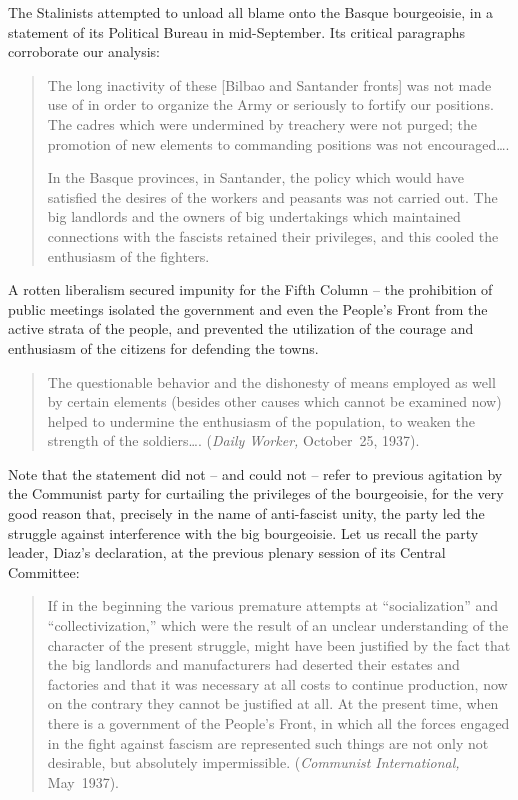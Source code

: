 The Stalinists attempted to unload all blame onto the Basque bourgeoisie, in a statement of its Political Bureau in mid-September. Its critical paragraphs corroborate our analysis:

\begin{quotation}
  The long inactivity of these [Bilbao and Santander fronts] was not made use of in order to organize the Army or seriously to fortify our positions. The cadres which were undermined by treachery were not purged; the promotion of new elements to commanding positions was not encouraged\dots.
  
  In the Basque provinces, in Santander, the policy which would have satisfied the desires of the workers and peasants was not carried out. The big landlords and the owners of big undertakings which maintained connections with the fascists retained their privileges, and this cooled the enthusiasm of the fighters.
\end{quotation}

A rotten liberalism secured impunity for the Fifth Column -- the prohibition of public meetings isolated the government and even the People’s Front from the active strata of the people, and prevented the utilization of the courage and enthusiasm of the citizens for defending the towns.

\begin{quotation}
  The questionable behavior and the dishonesty of means employed as well by certain elements (besides other causes which cannot be examined now) helped to undermine the enthusiasm of the population, to weaken the strength of the soldiers\dots. (\emph{Daily Worker,} October~25, 1937).
\end{quotation}

Note that the statement did not – and could not – refer to previous agitation by the Communist party for curtailing the privileges of the bourgeoisie, for the very good reason that, precisely in the name of anti-fascist unity, the party led the struggle against interference with the big bourgeoisie. Let us recall the party leader, Diaz’s declaration, at the previous plenary session of its Central Committee:

\begin{quotation}
  If in the beginning the various premature attempts at ``so\-cial\-i\-za\-tion'' and ``collectivization,'' which were the result of an unclear understanding of the character of the present struggle, might have been justified by the fact that the big landlords and manufacturers had deserted their estates and factories and that it was necessary at all costs to continue production, now on the contrary they cannot be justified at all. At the present time, when there is a government of the People’s Front, in which all the forces engaged in the fight against fascism are represented such things are not only not desirable, but absolutely impermissible. (\emph{Communist International,} May~1937).
\end{quotation}

